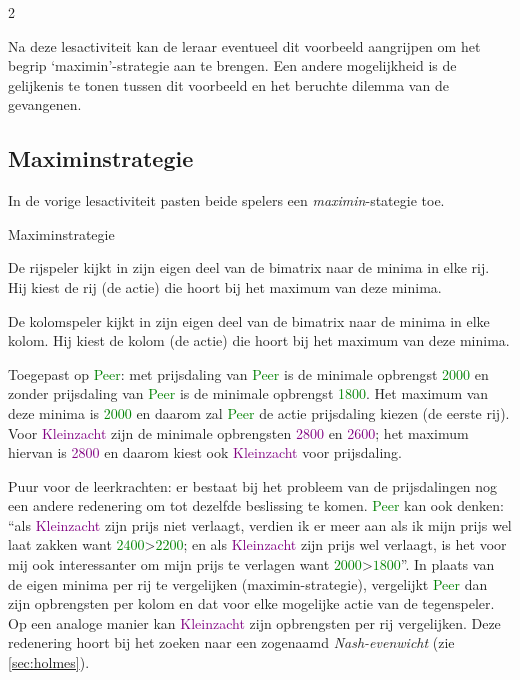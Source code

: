 \begin{multicols}{2}

Na deze lesactiviteit kan de leraar eventueel dit voorbeeld aangrijpen om het begrip `maximin'-strategie aan te brengen. Een andere mogelijkheid is de gelijkenis te tonen tussen dit voorbeeld en het beruchte dilemma van de gevangenen. 

\subsection{Maximinstrategie}

In de vorige lesactiviteit pasten beide spelers een \emph{maximin}-stategie toe.  

\begin{kader}{}{Maximinstrategie}

De rijspeler kijkt in zijn eigen deel van de bimatrix naar de minima in elke rij. Hij kiest de rij (de actie) die hoort bij het maximum van deze minima.

De kolomspeler kijkt in zijn eigen deel van de bimatrix naar de minima in elke kolom. Hij kiest de kolom (de actie) die hoort bij het maximum van deze minima.

\end{kader}

\vfill\null
\columnbreak

Toegepast op \textcolor{green}{Peer}: met prijsdaling van \textcolor{green}{Peer} is de minimale opbrengst \textcolor{green}{2000} en zonder prijsdaling  van \textcolor{green}{Peer} is de minimale opbrengst \textcolor{green}{1800}. Het maximum van deze minima is \textcolor{green}{2000} en daarom zal \textcolor{green}{Peer} de actie prijsdaling kiezen (de eerste rij).
Voor \textcolor{purple}{Kleinzacht} zijn de minimale opbrengsten \textcolor{purple}{2800} en \textcolor{purple}{2600}; het maximum hiervan is \textcolor{purple}{2800} en daarom kiest ook \textcolor{purple}{Kleinzacht} voor prijsdaling.

Puur voor de leerkrachten: er bestaat bij het probleem van de prijsdalingen nog een andere redenering om tot dezelfde beslissing te komen. \textcolor{green}{Peer} kan ook denken: ``als \textcolor{purple}{Kleinzacht} zijn prijs niet verlaagt, verdien ik er meer aan als ik mijn prijs wel laat zakken want \textcolor{green}{$2400$}>\textcolor{green}{$2200$}; en als \textcolor{purple}{Kleinzacht} zijn prijs wel verlaagt, is het voor mij ook interessanter om mijn prijs te verlagen want \textcolor{green}{$2000$}>\textcolor{green}{$1800$}''.
In plaats van de eigen minima per rij te vergelijken (maximin-strategie), vergelijkt \textcolor{green}{Peer} dan zijn opbrengsten per kolom en dat voor elke mogelijke actie van de tegenspeler. Op een analoge manier kan \textcolor{purple}{Kleinzacht} zijn opbrengsten per rij vergelijken. Deze redenering hoort bij het zoeken naar een zogenaamd \emph{Nash-evenwicht} (zie \autoref{sec:holmes}).
\clearpage


\end{multicols}
